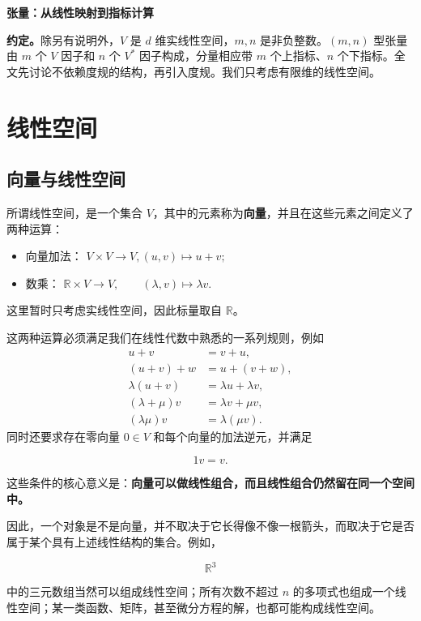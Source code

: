 \documentclass[UTF8,11pt,a4paper,fontset=fandol]{ctexart}
\numberwithin{equation}{section}
\begin{document}
\thispagestyle{plain}
\begin{center}
  {\LARGE\bfseries 张量：从线性映射到指标计算\par}
\end{center}


\noindent\textbf{约定。}除另有说明外，$V$ 是 $d$ 维实线性空间，$m,n$ 是非负整数。$(m,n)$ 型张量由 $m$ 个 $V$ 因子和 $n$ 个 $V^*$ 因子构成，分量相应带 $m$ 个上指标、$n$ 个下指标。全文先讨论不依赖度规的结构，再引入度规。我们只考虑有限维的线性空间。



\section{线性空间}
\subsection{向量与线性空间}

所谓线性空间，是一个集合 $V$，其中的元素称为\textbf{向量}，并且在这些元素之间定义了两种运算：
\begin{itemize}
\item 向量加法：
\(    V\times V\longrightarrow V,
    (u,v)\longmapsto u+v;
   \)
\item 数乘：
\(    \mathbb{R}\times V\longrightarrow V,
    \qquad
    (\lambda,v)\longmapsto \lambda v.
   \)
\end{itemize}
这里暂时只考虑实线性空间，因此标量取自 $\mathbb{R}$。

这两种运算必须满足我们在线性代数中熟悉的一系列规则，例如
\begin{align}
u+v &= v+u,\\
(u+v)+w &= u+(v+w),\\
\lambda(u+v) &= \lambda u+\lambda v,\\
(\lambda+\mu)v &= \lambda v+\mu v,\\
(\lambda\mu)v &= \lambda(\mu v).
\end{align}
同时还要求存在零向量 $0\in V$ 和每个向量的加法逆元，并满足

$$
1v=v.
$$

这些条件的核心意义是：\textbf{向量可以做线性组合，而且线性组合仍然留在同一个空间中。}

因此，一个对象是不是向量，并不取决于它长得像不像一根箭头，而取决于它是否属于某个具有上述线性结构的集合。例如，

$$
\mathbb{R}^3
$$

中的三元数组当然可以组成线性空间；所有次数不超过 $n$ 的多项式也组成一个线性空间；某一类函数、矩阵，甚至微分方程的解，也都可能构成线性空间。
\end{document}
